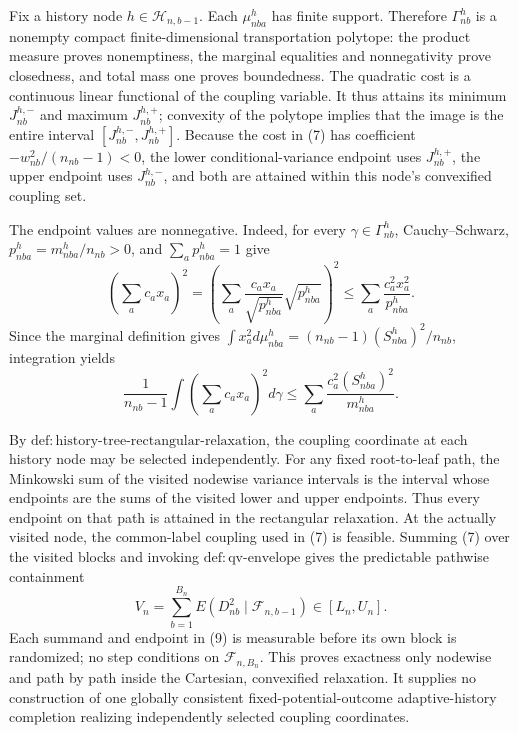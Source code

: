 Fix a history node \(h\in\mathcal H_{n,b-1}\). Each \(\mu_{nba}^h\) has finite support. Therefore \(\Gamma_{nb}^h\) is a nonempty compact finite-dimensional transportation polytope: the product measure proves nonemptiness, the marginal equalities and nonnegativity prove closedness, and total mass one proves boundedness. The quadratic cost is a continuous linear functional of the coupling variable. It thus attains its minimum \(J_{nb}^{h,-}\) and maximum \(J_{nb}^{h,+}\); convexity of the polytope implies that the image is the entire interval \([J_{nb}^{h,-},J_{nb}^{h,+}]\). Because the cost in (7) has coefficient \(-w_{nb}^2/(n_{nb}-1)<0\), the lower conditional-variance endpoint uses \(J_{nb}^{h,+}\), the upper endpoint uses \(J_{nb}^{h,-}\), and both are attained within this node's convexified coupling set.

The endpoint values are nonnegative. Indeed, for every \(\gamma\in\Gamma_{nb}^h\), Cauchy--Schwarz, \(p_{nba}^h=m_{nba}^h/n_{nb}>0\), and \(\sum_ap_{nba}^h=1\) give
\[
\left(\sum_ac_ax_a\right)^2
=\left(\sum_a\frac{c_ax_a}{\sqrt{p_{nba}^h}}\sqrt{p_{nba}^h}\right)^2
\le\sum_a\frac{c_a^2x_a^2}{p_{nba}^h}.
\]
Since the marginal definition gives
\(
\int x_a^2d\mu_{nba}^h=(n_{nb}-1)(S_{nba}^h)^2/n_{nb}
\), integration yields
\[
\frac1{n_{nb}-1}\int\left(\sum_ac_ax_a\right)^2d\gamma
\le\sum_a\frac{c_a^2(S_{nba}^h)^2}{m_{nba}^h}.
\tag{8}
\]

By \(\mathrm{def:history\text{-}tree\text{-}rectangular\text{-}relaxation}\), the coupling coordinate at each history node may be selected independently. For any fixed root-to-leaf path, the Minkowski sum of the visited nodewise variance intervals is the interval whose endpoints are the sums of the visited lower and upper endpoints. Thus every endpoint on that path is attained in the rectangular relaxation. At the actually visited node, the common-label coupling used in (7) is feasible. Summing (7) over the visited blocks and invoking \(\mathrm{def:qv\text{-}envelope}\) gives the predictable pathwise containment
\[
V_n=\sum_{b=1}^{B_n}E(D_{nb}^2\mid\mathcal F_{n,b-1})\in[L_n,U_n].
\tag{9}
\]
Each summand and endpoint in (9) is measurable before its own block is randomized; no step conditions on \(\mathcal F_{n,B_n}\). This proves exactness only nodewise and path by path inside the Cartesian, convexified relaxation. It supplies no construction of one globally consistent fixed-potential-outcome adaptive-history completion realizing independently selected coupling coordinates.

